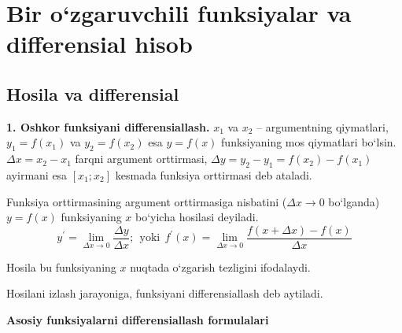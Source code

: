 \chapter{Bir o`zgaruvchili funksiyalar va differensial hisob}
\section{Hosila va differensial}
\hspace{0.6cm}
\textbf{1. Oshkor funksiyani differensiallash.}
$x_{1}$ va $x_{2}$ -- argumentning qiymatlari, $y_{1}=f(x_{1})$ va $y_{2}=f(x_{2})$ esa $y=f(x)$ funksiyaning mos qiymatlari bo`lsin. $\Delta x=x_{2}-x_{1}$ farqni argument orttirmasi, $\Delta y=y_{2}-y_{1}=f(x_{2})-f(x_{1})$ ayirmani esa $[x_{1};x_{2}]$ kesmada funksiya orttirmasi deb ataladi. 

\hspace{0.6cm}Funksiya orttirmasining argument orttirmasiga nisbatini ($\Delta x\to 0$ bo`lganda) $y=f(x)$ funksiyaning $x$ bo`yicha hosilasi deyiladi. 
$$y^{\prime}=\lim\limits_{\Delta x\to0}\frac{\Delta y}{\Delta x};\ \  \textrm{yoki}\ \ f^{\prime}(x)=\lim\limits_{\Delta x\to0}\frac{f(x+\Delta x)-f(x)}{\Delta x}$$

Hosila bu funksiyaning $x$  nuqtada o`zgarish tezligini ifodalaydi.

Hosilani izlash jarayoniga, funksiyani differensiallash deb aytiladi.

\textbf{Asosiy funksiyalarni differensiallash formulalari}


